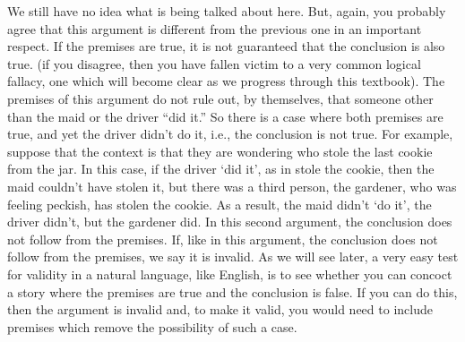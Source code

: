 We still have no idea what is being talked about here. But, again, you probably agree that this argument is different from the previous one in an important respect. If the premises are true, it is not guaranteed that the conclusion is also true. (if you disagree, then you have fallen victim to a very common logical fallacy, one which will become clear as we progress through this textbook). The premises of this argument do not rule out, by themselves, that someone other than the maid or the driver “did it.” So there is a case where both premises are true, and yet the driver didn’t do it, i.e., the conclusion is not true. For example, suppose that the context is that they are wondering who stole the last cookie from the jar. In this case, if the driver ‘did it', as in stole the cookie, then the maid couldn't have stolen it, but there was a third person, the gardener, who was feeling peckish, has stolen the cookie. As a result, the maid didn't ‘do it', the driver didn't, but the gardener did. In this second argument, the conclusion does not follow from the premises. If, like in this argument, the conclusion does not follow from the premises, we say it is invalid. As we will see later, a very easy test for validity in a natural language, like English, is to see whether you can concoct a story where the premises are true and the conclusion is false. If you can do this, then the argument is invalid and, to make it valid, you would need to include premises which remove the possibility of such a case.


